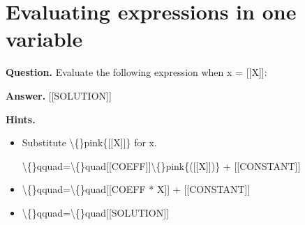 \documentclass{article}
\begin{document}
\section*{Evaluating expressions in one variable}
\textbf{Question.} Evaluate the following expression when
                    x = [[X]]:

\textbf{Answer.} [[SOLUTION]]

\textbf{Hints.}
\begin{itemize}
  \item Substitute \textbackslash\{\}pink\{[[X]]\} for
                    x.
                
                
                    \textbackslash\{\}qquad=\textbackslash\{\}quad[[COEFF]]\textbackslash\{\}pink\{([[X]])\} +
                    [[CONSTANT]]
  \item \textbackslash\{\}qquad=\textbackslash\{\}quad[[COEFF * X]] + [[CONSTANT]]
  \item \textbackslash\{\}qquad=\textbackslash\{\}quad[[SOLUTION]]
\end{itemize}
\end{document}
